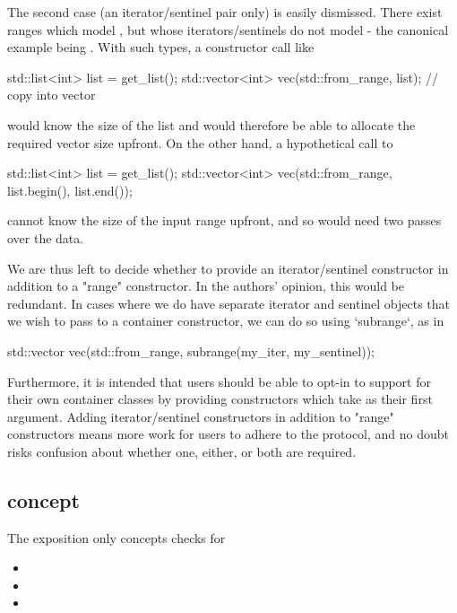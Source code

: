 \documentclass{wg21}
\begin{document}
The second case (an iterator/sentinel pair only) is easily dismissed. There exist ranges which model , but whose iterators/sentinels do not model  - the canonical example being . With such types, a constructor call like

\begin{colorblock}
std::list<int> list = get_list();
std::vector<int> vec(std::from_range, list); // copy into vector
\end{colorblock}

would know the size of the list and would therefore be able to allocate the required vector size upfront. On the other hand, a hypothetical call to

\begin{colorblock}
std::list<int> list = get_list();
std::vector<int> vec(std::from_range, list.begin(), list.end());
\end{colorblock}

cannot know the size of the input range upfront, and so would need two passes over the data.

We are thus left to decide whether to provide an iterator/sentinel constructor in addition to a "range" constructor. In the authors' opinion, this would be redundant. In cases where we do have separate iterator and sentinel objects that we wish to pass to a container constructor, we can do so using `subrange`, as in

\begin{colorblock}
std::vector vec(std::from_range, subrange(my_iter, my_sentinel));
\end{colorblock}

Furthermore, it is intended that users should be able to opt-in to  support for their own container classes by providing constructors which take  as their first argument. Adding iterator/sentinel constructors in addition to "range" constructors means more work for users to adhere to the protocol, and no doubt risks confusion about whether one, either, or both are required.

\subsection{ concept}

The exposition only  concepts checks for
\begin{itemize}
    \item {}
    \item {}
    \item {}
\end{itemize}
\end{document}
